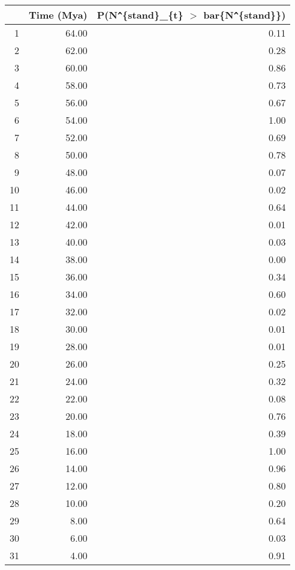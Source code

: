 \begin{table}[ht]
\centering
\begin{tabular}{rrr}
  \hline
 & Time (Mya) & P(N\verb|^|\{stand\}\_\{t\} $>$ bar\{N\verb|^|\{stand\}\}) \\ 
  \hline
1 & 64.00 & 0.11 \\ 
  2 & 62.00 & 0.28 \\ 
  3 & 60.00 & 0.86 \\ 
  4 & 58.00 & 0.73 \\ 
  5 & 56.00 & 0.67 \\ 
  6 & 54.00 & 1.00 \\ 
  7 & 52.00 & 0.69 \\ 
  8 & 50.00 & 0.78 \\ 
  9 & 48.00 & 0.07 \\ 
  10 & 46.00 & 0.02 \\ 
  11 & 44.00 & 0.64 \\ 
  12 & 42.00 & 0.01 \\ 
  13 & 40.00 & 0.03 \\ 
  14 & 38.00 & 0.00 \\ 
  15 & 36.00 & 0.34 \\ 
  16 & 34.00 & 0.60 \\ 
  17 & 32.00 & 0.02 \\ 
  18 & 30.00 & 0.01 \\ 
  19 & 28.00 & 0.01 \\ 
  20 & 26.00 & 0.25 \\ 
  21 & 24.00 & 0.32 \\ 
  22 & 22.00 & 0.08 \\ 
  23 & 20.00 & 0.76 \\ 
  24 & 18.00 & 0.39 \\ 
  25 & 16.00 & 1.00 \\ 
  26 & 14.00 & 0.96 \\ 
  27 & 12.00 & 0.80 \\ 
  28 & 10.00 & 0.20 \\ 
  29 & 8.00 & 0.64 \\ 
  30 & 6.00 & 0.03 \\ 
  31 & 4.00 & 0.91 \\ 
   \hline
\end{tabular}
\label{tab:div_peak}
\end{table}
